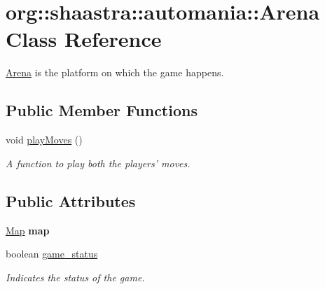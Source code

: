 \hypertarget{classorg_1_1shaastra_1_1automania_1_1Arena}{
\section{\-o\-r\-g\-:\-:\-s\-h\-a\-a\-s\-t\-r\-a\-:\-:\-a\-u\-t\-o\-m\-a\-n\-i\-a\-:\-:\-A\-r\-e\-n\-a \-C\-l\-a\-s\-s \-R\-e\-f\-e\-r\-e\-n\-c\-e}
\label{classorg_1_1shaastra_1_1automania_1_1Arena}
}


\hyperlink{classorg_1_1shaastra_1_1automania_1_1Arena}{Arena} is the platform on which the game happens.  


\subsection*{Public Member Functions}
\begin{DoxyCompactItemize}
\item 
\-v\-o\-i\-d \hyperlink{classorg_1_1shaastra_1_1automania_1_1Arena_af8d20ae5326dbeee49279d196ee38ea4}{\-p\-l\-a\-y\-M\-o\-v\-e\-s} \-(\-)
\begin{DoxyCompactList}\small\item\em A function to play both the players' moves. \end{DoxyCompactList}\end{DoxyCompactItemize}
\subsection*{Public Attributes}
\begin{DoxyCompactItemize}
\item 
\hypertarget{classorg_1_1shaastra_1_1automania_1_1Arena_a3d331629f0c72cef37a3bfc409d599db}{
\hyperlink{classorg_1_1shaastra_1_1automania_1_1Map}{\-M\-a\-p} {\bfseries \-m\-a\-p}}
\label{classorg_1_1shaastra_1_1automania_1_1Arena_a3d331629f0c72cef37a3bfc409d599db}

\item 
\hypertarget{classorg_1_1shaastra_1_1automania_1_1Arena_aa6445f71a9fb404e564f2151d6260b6c}{
\-b\-o\-o\-l\-e\-a\-n \hyperlink{classorg_1_1shaastra_1_1automania_1_1Arena_aa6445f71a9fb404e564f2151d6260b6c}{\-g\-a\-m\-e\_\-\-s\-t\-a\-t\-u\-s}}
\label{classorg_1_1shaastra_1_1automania_1_1Arena_aa6445f71a9fb404e564f2151d6260b6c}

\begin{DoxyCompactList}\small\item\em Indicates the status of the game. \end{DoxyCompactList}\end{DoxyCompactItemize}


